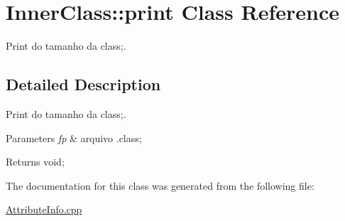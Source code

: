 \hypertarget{class_inner_class_1_1print}{}\section{Inner\+Class\+:\+:print Class Reference}
\label{class_inner_class_1_1print}


Print do tamanho da class;.  




\subsection{Detailed Description}
Print do tamanho da class;. 


\begin{DoxyParams}{Parameters}
{\em fp} & arquivo .class; \\
\hline
\end{DoxyParams}
\begin{DoxyReturn}{Returns}
void; 
\end{DoxyReturn}


The documentation for this class was generated from the following file\+:\begin{DoxyCompactItemize}
\item 
\hyperlink{_attribute_info_8cpp}{Attribute\+Info.\+cpp}\end{DoxyCompactItemize}
